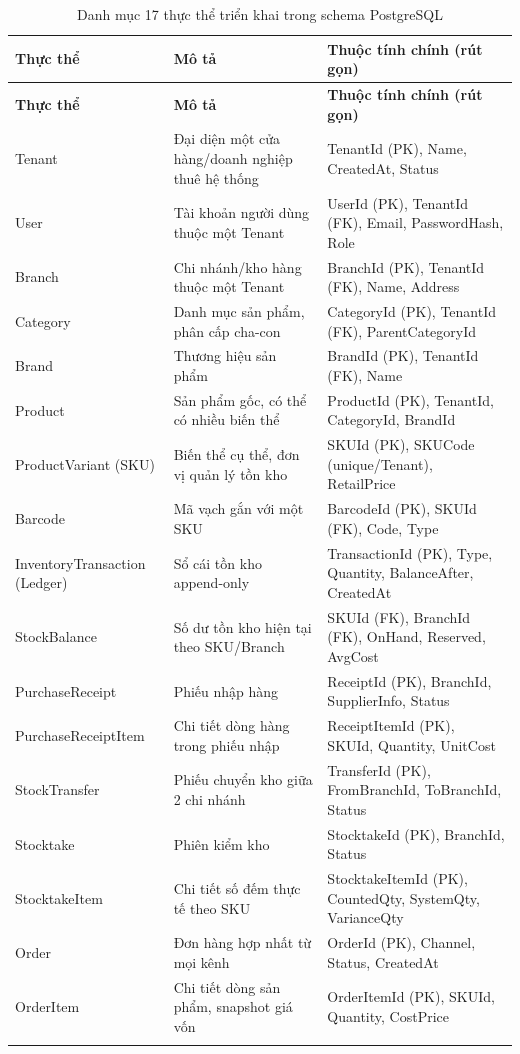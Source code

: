 \begin{longtable}{|p{3.4cm}|p{5.5cm}|p{5cm}|}
    \hline
    \textbf{Thực thể} & \textbf{Mô tả} & \textbf{Thuộc tính chính (rút gọn)} \\
    \hline
    \endfirsthead
    \hline
    \textbf{Thực thể} & \textbf{Mô tả} & \textbf{Thuộc tính chính (rút gọn)} \\
    \hline
    \endhead
    Tenant & Đại diện một cửa hàng/doanh nghiệp thuê hệ thống & TenantId (PK), Name, CreatedAt, Status \\
    \hline
    User & Tài khoản người dùng thuộc một Tenant & UserId (PK), TenantId (FK), Email, PasswordHash, Role \\
    \hline
    Branch & Chi nhánh/kho hàng thuộc một Tenant & BranchId (PK), TenantId (FK), Name, Address \\
    \hline
    Category & Danh mục sản phẩm, phân cấp cha-con & CategoryId (PK), TenantId (FK), ParentCategoryId \\
    \hline
    Brand & Thương hiệu sản phẩm & BrandId (PK), TenantId (FK), Name \\
    \hline
    Product & Sản phẩm gốc, có thể có nhiều biến thể & ProductId (PK), TenantId, CategoryId, BrandId \\
    \hline
    ProductVariant (SKU) & Biến thể cụ thể, đơn vị quản lý tồn kho & SKUId (PK), SKUCode (unique/Tenant), RetailPrice \\
    \hline
    Barcode & Mã vạch gắn với một SKU & BarcodeId (PK), SKUId (FK), Code, Type \\
    \hline
    InventoryTransaction (Ledger) & Sổ cái tồn kho append-only & TransactionId (PK), Type, Quantity, BalanceAfter, CreatedAt \\
    \hline
    StockBalance & Số dư tồn kho hiện tại theo SKU/Branch & SKUId (FK), BranchId (FK), OnHand, Reserved, AvgCost \\
    \hline
    PurchaseReceipt & Phiếu nhập hàng & ReceiptId (PK), BranchId, SupplierInfo, Status \\
    \hline
    PurchaseReceiptItem & Chi tiết dòng hàng trong phiếu nhập & ReceiptItemId (PK), SKUId, Quantity, UnitCost \\
    \hline
    StockTransfer & Phiếu chuyển kho giữa 2 chi nhánh & TransferId (PK), FromBranchId, ToBranchId, Status \\
    \hline
    Stocktake & Phiên kiểm kho & StocktakeId (PK), BranchId, Status \\
    \hline
    StocktakeItem & Chi tiết số đếm thực tế theo SKU & StocktakeItemId (PK), CountedQty, SystemQty, VarianceQty \\
    \hline
    Order & Đơn hàng hợp nhất từ mọi kênh & OrderId (PK), Channel, Status, CreatedAt \\
    \hline
    OrderItem & Chi tiết dòng sản phẩm, snapshot giá vốn & OrderItemId (PK), SKUId, Quantity, CostPrice \\
    \hline
    \caption{Danh mục 17 thực thể triển khai trong schema PostgreSQL}
    \label{tab:entity-catalog}
\end{longtable}

